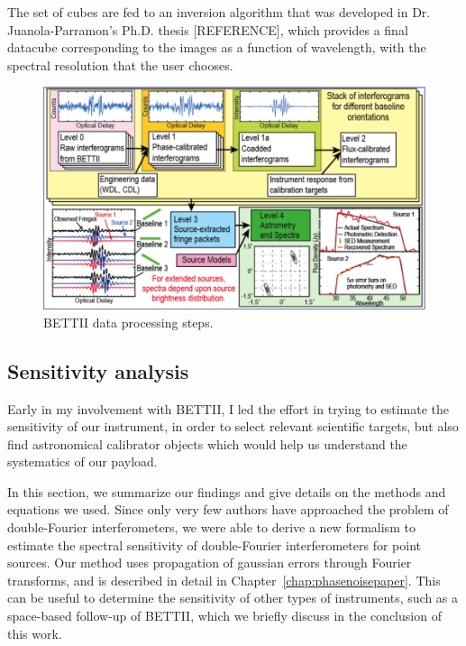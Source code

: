 The set of cubes are fed to an inversion algorithm that was developed in Dr. Juanola-Parramon's Ph.D. thesis [REFERENCE], which provides a final datacube corresponding to the images as a function of wavelength, with the spectral resolution that the user chooses. 

\begin{figure}[!ht]
	\centering
	\includegraphics[width=\textwidth]{Figures/DataProcessing.png}
	\caption[Data processing]{BETTII data processing steps.}
	\label{fig:dataProcessing}
    \end{figure}




\subsection{Sensitivity analysis}

Early in my involvement with BETTII, I led the effort in trying to estimate the sensitivity of our instrument, in order to select relevant scientific targets, but also find astronomical calibrator objects which would help us understand the systematics of our payload.

In this section, we summarize our findings and give details on the methods and equations we used. Since only very few authors have approached the problem of double-Fourier interferometers, we were able to derive a new formalism to estimate the spectral sensitivity of double-Fourier interferometers for point sources. Our method uses propagation of gaussian errors through Fourier transforms, and is described in detail in Chapter~\ref{chap:phasenoisepaper}. This can be useful to determine the sensitivity of other types of instruments, such as a space-based follow-up of BETTII, which we briefly discuss in the conclusion of this work.

